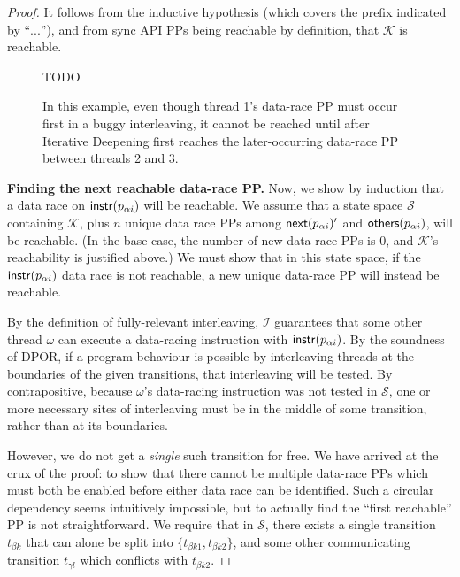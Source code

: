 \begin{proof}
It follows from the inductive hypothesis (which covers the prefix indicated by ``$...$''),
and from sync API PPs being reachable by definition,
that $\mathcal{K}$ is reachable.

\begin{figure}[t]
	TODO %
	\caption{In this example, even though thread 1's data-race PP must occur first in a buggy interleaving, it cannot be reached until after Iterative Deepening first reaches the later-occurring data-race PP between threads 2 and 3.}
	\label{fig:threethreads}
\end{figure}

\newcommand\tbk{\ensuremath{t_{\beta{}k}}}
\newcommand\tbka{\ensuremath{t_{\beta{}k1}}}
\newcommand\tbkb{\ensuremath{t_{\beta{}k2}}}
\newcommand\tgl{\ensuremath{t_{\gamma{}l}}}

{\bf Finding the next reachable data-race PP.}
Now, we show by induction that a data race on $\mathsf{instr}(p_{\alpha{}i})$ will be reachable.
We assume that a state space $\mathcal{S}$ containing $\mathcal{K}$,
plus $n$ unique data race PPs among $\mathsf{next}(p_{\alpha{}i})'$ and $\mathsf{others}(p_{\alpha{}i})$,
will be reachable.
(In the base case, the number of new data-race PPs is 0, and $\mathcal{K}$'s reachability is justified above.)
We must show that in this state space, if the $\mathsf{instr}(p_{\alpha{}i})$ data race is not reachable,
a new unique data-race PP will instead be reachable.

By the definition of fully-relevant interleaving, $\mathcal{I}$ guarantees that some other thread $\omega$ can execute a data-racing instruction with $\mathsf{instr}(p_{\alpha{}i})$.
%
By the soundness of DPOR, if a program behaviour is possible by interleaving threads at the boundaries of
the given transitions, that interleaving will be tested.
By contrapositive,
because $\omega$'s data-racing instruction was not tested in $\mathcal{S}$, one or more necessary sites of interleaving must be in the middle of some transition, rather than at its boundaries.

However, we do not get a {\em single} such transition for free.
We have arrived at the crux of the proof:
to show that there cannot be multiple data-race PPs which must both be enabled before either data race can be identified.
Such a circular dependency seems intuitively impossible, but to actually find the ``first reachable'' PP is not straightforward.
We require that in $\mathcal{S}$, there exists a single transition $\tbk$ that can alone be split into $\{\tbka,\tbkb\}$,
and some other communicating transition $\tgl$ which conflicts with $\tbkb$.


\end{proof}
